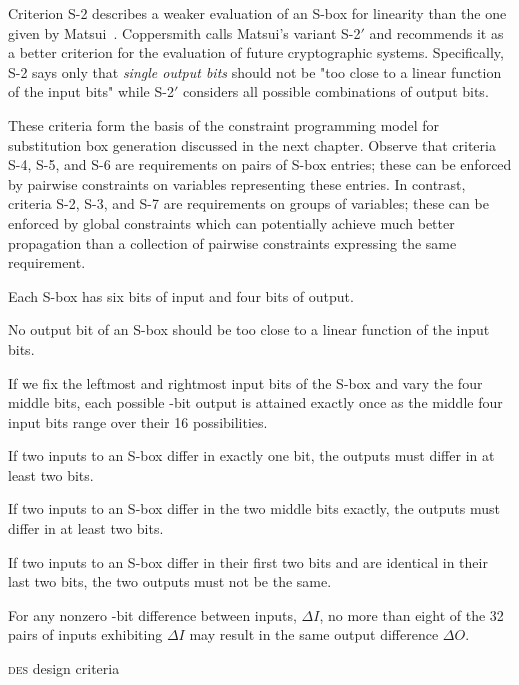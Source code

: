 \documentclass[a4paper,10pt,twoside,openright]{book}
\renewcommand{\sc}[1]{\textsc{\lowercase{#1}}}
\renewcommand{\ln}[1]{{\fontsize{8pt}{8pt}\selectfont#1}}
\begin{document}
Criterion S-2 describes a weaker evaluation of an S-box for linearity than the one given by Matsui~\cite{matsui}. Coppersmith calls Matsui's variant S-2$'$ and recommends it as a better criterion for the evaluation of future cryptographic systems. Specifically, S-2 says only that \textit{single output bits} should not be "too close to a linear function of the input bits" while S-2$'$ considers all possible combinations of output bits. 

These criteria form the basis of the constraint programming model for substitution box generation discussed in the next chapter. 
Observe that criteria S-4, S-5, and S-6 are requirements on pairs of S-box entries; these can be enforced by pairwise constraints on variables representing these entries. 
In contrast, criteria S-2, S-3, and S-7 are requirements on groups of variables; these can be enforced by global constraints which can potentially achieve much better propagation than a collection of pairwise constraints expressing the same requirement.

\begin{table}
\begin{SL}
    \item Each S-box has six bits of input and four bits of output. \\
    \item No output bit of an S-box should be too close to a linear function of the input bits. \\
    \item If we fix the leftmost and rightmost input bits of the S-box and vary the four middle bits, each possible \ln{4}-bit output is attained exactly once as the middle four input bits range over their 16 possibilities. \\
    \item If two inputs to an S-box differ in exactly one bit, the outputs must differ in at least two bits. \\
    \item If two inputs to an S-box differ in the two middle bits exactly, the outputs must differ in at least two bits. \\
    \item If two inputs to an S-box differ in their first two bits and are identical in their last two bits, the two outputs must not be the same. \\
    \item For any nonzero \ln{6}-bit difference between inputs, $\Delta I$, no more than eight of the 32 pairs of inputs exhibiting $\Delta I$ may result in the same output difference $\Delta O$. \\
\end{SL}
\caption{\sc{DES} design criteria~\cite{coppersmith}}
\label{tab:descriteria}
\end{table}
\end{document}

